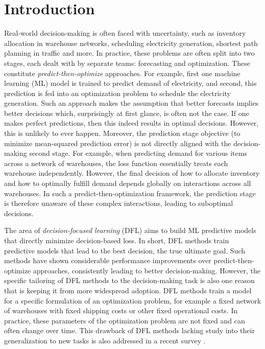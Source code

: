 \documentclass{article}
\theoremstyle{plain}
\theoremstyle{definition}
\theoremstyle{remark}
\begin{document}
\section{Introduction}
\label{sec:intro}

Real-world decision-making is often faced with uncertainty, such as inventory allocation in warehouse networks, scheduling electricity generation, shortest path planning in traffic and more. In practice, these problems are often split into two stages, each dealt with by separate teams: forecasting and optimization. These constitute \emph{predict-then-optimize} approaches. For example, first one machine learning (ML) model is trained to predict demand of electricity, and second, this prediction is fed into an optimization problem to schedule the electricity generation. Such an approach makes the assumption that better forecasts implies better decisions which, surprisingly at first glance, is often not the case. If one makes perfect predictions, then  this indeed results in optimal decisions. However, this is unlikely to ever happen. Moreover, the prediction stage objective (to minimize mean-squared prediction error) is not directly aligned with the decision-making second stage. For example, when predicting demand for various items across a network of warehouses, the loss function essentially treats each warehouse independently. However, the final decision of how to allocate inventory and how to optimally fulfill demand depends globally on interactions across all warehouses. In such a predict-then-optimization framework, the prediction stage is therefore unaware of these complex interactions, leading to suboptimal decisions.

The area of \emph{decision-focused learning} (DFL) aims to build ML predictive models that directly minimize decision-based loss. In short, DFL methods train predictive models that lead to the best decision, the true ultimate goal. Such methods have shown considerable performance improvements over predict-then-optimize approaches, consistently leading to better decision-making. However, the specific tailoring of DFL methods to the decision-making task is also one reason that is keeping it from more widespread adoption. DFL methods train a model for a specific formulation of an optimization problem, for example a fixed network of warehouses with fixed shipping costs or other fixed operational costs. In practice, these parameters of the optimization problem are not fixed and can often change over time. This drawback of DFL methods lacking study into their generalization to new tasks is also addressed in a recent survey \cite{mandi2024decision}. 
\end{document}
